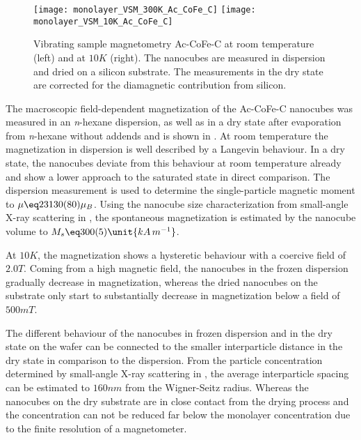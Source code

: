 \documentclass[\main/dresen_thesis.tex]{subfiles}
\begin{document}
  \label{sec:monolayers:nanoparticle:vsm}

  \begin{figure}[tb]
    \centering
    \texttt{[image: monolayer\_VSM\_300K\_Ac\_CoFe\_C]}
    \texttt{[image: monolayer\_VSM\_10K\_Ac\_CoFe\_C]}
    \caption{\label{fig:monolayers:nanoparticle:vsmAcCoFeC}Vibrating sample magnetometry Ac-CoFe-C at room temperature (left) and at $10 \unit{K}$ (right). The nanocubes are measured in dispersion and dried on a silicon substrate. The measurements in the dry state are corrected for the diamagnetic contribution from silicon.}
  \end{figure}

  The macroscopic field-dependent magnetization of the Ac-CoFe-C nanocubes was measured in an \textit{n}-hexane dispersion, as well as in a dry state after evaporation from \textit{n}-hexane without addends and is shown in .
  At room temperature the magnetization in dispersion is well described by a Langevin behaviour.
  In a dry state, the nanocubes deviate from this behaviour at room temperature already and show a lower approach to the saturated state in direct comparison.
  The dispersion measurement is used to determine the single-particle magnetic moment to $\mu \eq 23130(80) \mu_B$.
  Using the nanocube size characterization from small-angle X-ray scattering in , the spontaneous magnetization is estimated by the nanocube volume to $M_s \eq 300(5) \unit{kA\, m^{-1}}$.

  At $10 \unit{K}$, the magnetization shows a hysteretic behaviour with a coercive field of $2.0 \unit{T}$.
  Coming from a high magnetic field, the nanocubes in the frozen dispersion gradually decrease in magnetization, whereas the dried nanocubes on the substrate only start to substantially decrease in magnetization below a field of $500 \unit{mT}$.

  The different behaviour of the nanocubes in frozen dispersion and in the dry state on the wafer can be connected to the smaller interparticle distance in the dry state in comparison to the dispersion.
  From the particle concentration determined by small-angle X-ray scattering in , the average interparticle spacing can be estimated to $160 \unit{nm}$ from the Wigner-Seitz radius.
  Whereas the nanocubes on the dry substrate are in close contact from the drying process and the concentration can not be reduced far below the monolayer concentration due to the finite resolution of a magnetometer.
\end{document}
